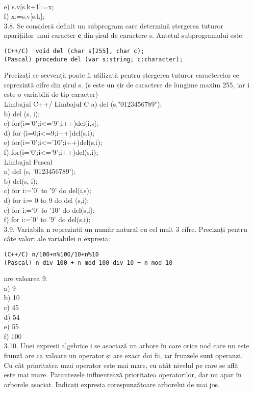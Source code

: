 \\
e) s.v[s.k+1]:=x;
\\
f) x:=s.v[s.k];
\\
3.8. Se consideră definit un subprogram care determină ștergerea tuturor aparițiilor unui caracter $\mathbf{c}$ din șirul de caractere s. Antetul subprogramului este:
\begin{verbatim}
(C++/C)  void del (char s[255], char c); 
(Pascal) procedure del (var s:string; c:character); 
\end{verbatim}
Precizați ce secvență poate fi utilizată pentru ștergerea tuturor caracterelor ce reprezintă cifre din șirul s. (s este un șir de caractere de lungime maxim 255, iar i este o variabilă de tip caracter)
\\
Limbajul C++/ Limbajul C
a) del (s,"0123456789");
\\
b) del (s, i);
\\
c) for(i='0';i<='9';i++)del(i,s);
\\
d) for (i=0;i<=9;i++)del(s,i);
\\
e) for(i='0';i<='10';i++)del(s,i);
\\
f) for(i='0';i<='9';i++)del(s,i);
\\
Limbajul Pascal\\
a) del (s, '0123456789');
\\
b) del(s, i);
\\
c) for i:='0' to '9' do del(i,s);
\\
d) for i:= 0 to 9 do del (s,i);
\\
e) for i:='0' to '10' do del(s,i);
\\
f) for i:='0' to '9' do del(s,i);
\\
3.9. Variabila n reprezintă un număr natural cu cel mult 3 cifre. Precizați pentru câte valori ale variabilei $n$ expresia:
\begin{verbatim}
(C++/C) n/100+n%100/10+n%10
(Pascal) n div 100 + n mod 100 div 10 + n mod 10
\end{verbatim}
are valoarea 9.
\\
a) 9
\\
b) 10
\\
c) 45
\\
d) 54
\\
e) 55
\\
f) 100
\\
3.10. Unei expresii algebrice i se asociază un arbore în care orice nod care nu este frunză are ca valoare un operator și are exact doi fii, iar frunzele sunt operanzi. Cu cât prioritatea unui operator este mai mare, cu atât nivelul pe care se află este mai mare. Parantezele influențează prioritatea operatorilor, dar nu apar în arborele asociat. Indicați expresia corespunzătoare arborelui de mai jos.
